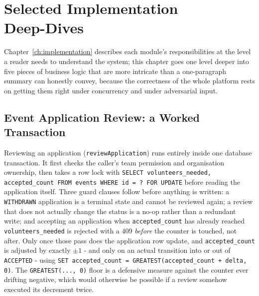 \chapter[Selected Implementation Deep-Dives]{Selected Implementation\\Deep-Dives}
\label{ch:deepdives}
Chapter~\ref{ch:implementation} describes each module's responsibilities at the level a reader needs to understand the system; this chapter goes one level deeper into five pieces of business logic that are more intricate than a one-paragraph summary can honestly convey, because the correctness of the whole platform rests on getting them right under concurrency and under adversarial input.

\section{Event Application Review: a Worked Transaction}
\label{sec:deepdive-events}
Reviewing an application (\texttt{reviewApplication}) runs entirely inside one database transaction. It first checks the caller's team permission and organisation ownership, then takes a row lock with \texttt{SELECT volunteers\_needed, accepted\_count FROM events WHERE id = ? FOR UPDATE} before reading the application itself. Three guard clauses follow before anything is written: a \texttt{WITHDRAWN} application is a terminal state and cannot be reviewed again; a review that does not actually change the status is a no-op rather than a redundant write; and accepting an application when \texttt{accepted\_count} has already reached \texttt{volunteers\_needed} is rejected with a 409 \emph{before} the counter is touched, not after. Only once those pass does the application row update, and \texttt{accepted\_count} is adjusted by exactly $\pm 1$ - and only on an actual transition into or out of \texttt{ACCEPTED} - using \texttt{SET accepted\_count = GREATEST(accepted\_count + delta, 0)}. The \texttt{GREATEST(...,\,0)} floor is a defensive measure against the counter ever drifting negative, which would otherwise be possible if a review somehow executed its decrement twice.

